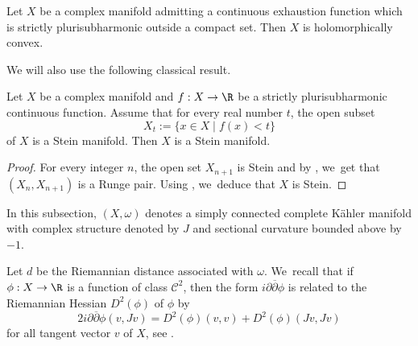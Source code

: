 \begin{theorem*}
Let $X$ be a complex manifold admitting a continuous exhaustion function which is strictly plurisubharmonic outside a compact set. Then $X$ is holomorphically convex.
\end{theorem*}

We will also use the following classical result.

\begin{theorem*}\label{thm-docquier-grauert}
Let $X$ be a complex manifold and $f:X\to \R$ be a strictly plurisubharmonic continuous function. Assume that for every real number $t$, the open subset
\begin{equation*}
X_t:= \{x\in X\mid f(x)<t\}
\end{equation*}
of $X$ is a Stein manifold. Then $X$ is a Stein manifold.
\end{theorem*}

\begin{proof}
For every integer $n$, the open set $X_{n+1}$ is Stein and by \cite[Cor.\,1]{narasimhanLeviProblemComplex1962}, we~get that $(X_{n},X_{n+1})$ is a Runge pair. Using \cite[Satz 1.3]{steinUberlagerungenHolomorphvollstandigerKomplexer1956}, we~deduce that $X$ is Stein.
\end{proof}


In this subsection, $(X,\omega)$ denotes a simply connected complete Kähler manifold with complex structure denoted by $J$ and sectional curvature bounded above by $-1$.

Let $d$ be the Riemannian distance associated with $\omega$. We~recall that if $\phi:X\to \R$ is a function of class $\mathcal{C}^2$, then the form $i\partial\overline{\partial}\phi$ is related to the Riemannian Hessian $D^{2}(\phi)$ of $\phi$ by \begin{equation}\label{eq-lev-hessienne}
2i\partial\overline{\partial}\phi(v,Jv)=D^{2}(\phi)(v,v)+D^{2}(\phi)(Jv,Jv)
\end{equation}
for all tangent vector $v$ of $X$, see \cite{greeneSubharmonicityPlurisubharmonicityGeodesically1973}.

